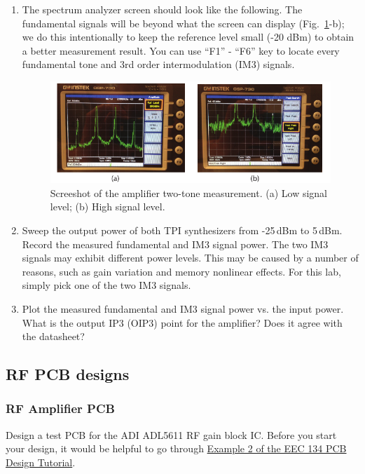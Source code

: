 \documentclass[letterpaper, 11pt]{article}
\begin{document}
\begin{enumerate}
	\item The spectrum analyzer screen should look like the following. The fundamental signals will be beyond what the screen can display (Fig.~\ref{fig:sa-two-tone-amp}-b); we do this intentionally to keep the reference level small (-20 dBm) to obtain a better measurement result. You can use ``F1'' - ``F6'' key to locate every fundamental tone and 3rd order intermodulation (IM3) signals. 
		\begin{figure}[h]
			\centering
			\includegraphics[width=4.5in]{sa-two-tone-amp}
			\caption{Screeshot of the amplifier two-tone measurement. (a) Low signal level; (b) High signal level.}
			\label{fig:sa-two-tone-amp}
		\end{figure}
	\item Sweep the output power of both TPI synthesizers from -25\,dBm to 5\,dBm. Record the measured fundamental and IM3 signal power. The two IM3 signals may exhibit different power levels. This may be caused by a number of reasons, such as gain variation and memory nonlinear effects. For this lab, simply pick one of the two IM3 signals.
	
	\item Plot the measured fundamental and IM3 signal power vs. the input power. What is the output IP3 (OIP3) point for the amplifier? Does it agree with the datasheet?

\end{enumerate}


\subsection{RF PCB designs}

\subsubsection{RF Amplifier PCB}
Design a test PCB for the ADI ADL5611 RF gain block IC. Before you start your design, it would be helpful to go through \href{https://github.com/ucdart/UCD-EEC134/blob/master/labs/appendices/kicad/pcb-tutorial.pdf}{Example 2 of the EEC 134 PCB Design Tutorial}. 
\end{document}
